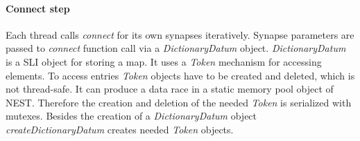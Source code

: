 \paragraph{Connect step}
Each thread calls \emph{connect} for its own synapses iteratively.
Synapse parameters are passed to \emph{connect} function call via a \emph{DictionaryDatum} object.
\emph{DictionaryDatum} is a SLI object for storing a map.
It uses a \emph{Token} mechanism for accessing elements.
To access entries \emph{Token} objects have to be created and deleted,
which is not thread-safe. It can produce a data race in a static memory pool object of NEST.
Therefore the creation and deletion of the needed \emph{Token} is serialized with mutexes.
Besides the creation of a \emph{DictionaryDatum} object \emph{createDictionaryDatum} creates needed \emph{Token} objects.

